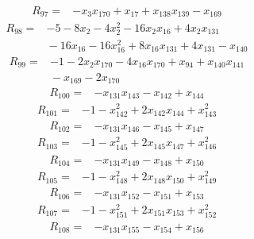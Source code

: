 {%
\begin{align*}
R_{97} ={}& -x_{3} x_{170} + x_{17} + x_{138} x_{139} - x_{169}
\end{align*}
\begin{align*}
R_{98} ={}& -5 - 8x_{2} - 4x_{2}^{2} - 16x_{2} x_{16} + 4x_{2} x_{131} \\
&{}  - 16x_{16} - 16x_{16}^{2} + 8x_{16} x_{131} + 4x_{131} - x_{140}
\end{align*}
\begin{align*}
R_{99} ={}& -1 - 2x_{2} x_{170} - 4x_{16} x_{170} + x_{94} + x_{140} x_{141} \\
&{}  - x_{169} - 2x_{170}
\end{align*}
\begin{align*}
R_{100} ={}& -x_{131} x_{143} - x_{142} + x_{144}
\end{align*}
\begin{align*}
R_{101} ={}& -1 - x_{142}^{2} + 2x_{142} x_{144} + x_{143}^{2}
\end{align*}
\begin{align*}
R_{102} ={}& -x_{131} x_{146} - x_{145} + x_{147}
\end{align*}
\begin{align*}
R_{103} ={}& -1 - x_{145}^{2} + 2x_{145} x_{147} + x_{146}^{2}
\end{align*}
\begin{align*}
R_{104} ={}& -x_{131} x_{149} - x_{148} + x_{150}
\end{align*}
\begin{align*}
R_{105} ={}& -1 - x_{148}^{2} + 2x_{148} x_{150} + x_{149}^{2}
\end{align*}
\begin{align*}
R_{106} ={}& -x_{131} x_{152} - x_{151} + x_{153}
\end{align*}
\begin{align*}
R_{107} ={}& -1 - x_{151}^{2} + 2x_{151} x_{153} + x_{152}^{2}
\end{align*}
\begin{align*}
R_{108} ={}& -x_{131} x_{155} - x_{154} + x_{156}
\end{align*}
}
